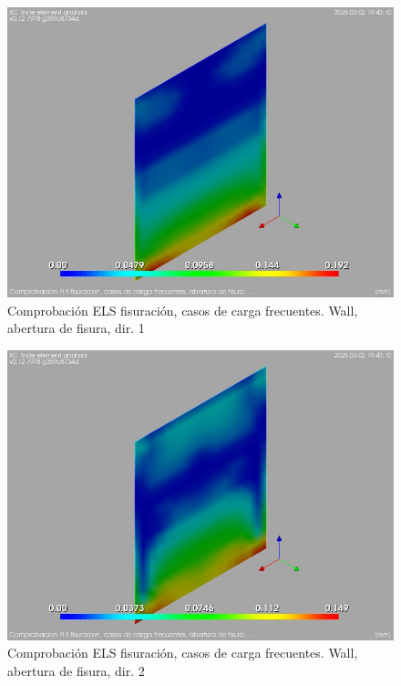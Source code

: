 \begin{figure}[ht]
\begin{center}
\includegraphics[width=\linewidth]{results/graphics/crackingSLS_freq/wallwkSect1}
\caption{Comprobación ELS fisuración, casos de carga frecuentes. Wall, abertura de fisura, dir. 1}
\label{SLS_frequentLoadsCrackControlwallwkSect1}
\end{center}
\end{figure}
\begin{figure}[ht]
\begin{center}
\includegraphics[width=\linewidth]{results/graphics/crackingSLS_freq/wallwkSect2}
\caption{Comprobación ELS fisuración, casos de carga frecuentes. Wall, abertura de fisura, dir. 2}
\label{SLS_frequentLoadsCrackControlwallwkSect2}
\end{center}
\end{figure}
